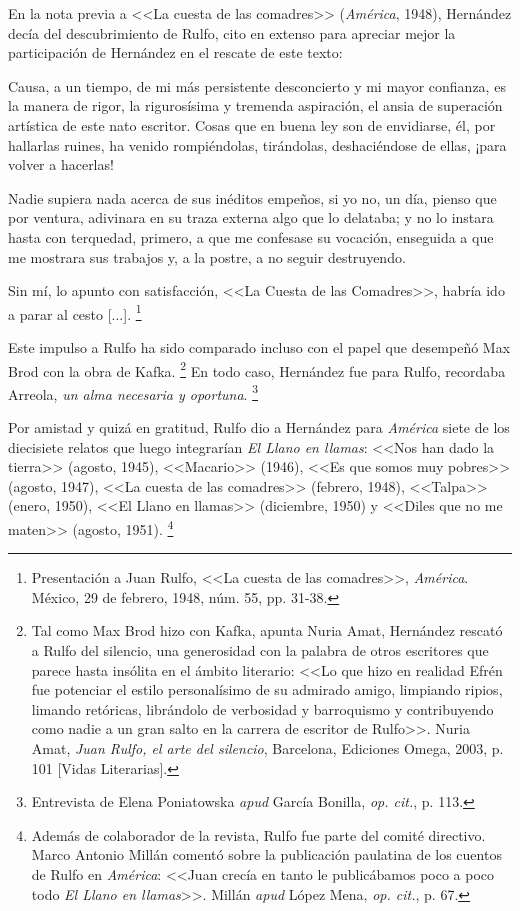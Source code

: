 \documentclass[14pt,twoside,final]{extbook} %
\let\oldfootnote\footnote
\renewcommand\footnote[1]{%
\oldfootnote{\hspace{1mm}#1}}
\begin{document}
En la nota previa a <<La cuesta de las comadres>> (\emph{América}, 1948), Hernández
decía del descubrimiento de Rulfo, cito en extenso para apreciar mejor la
participación de Hernández en el rescate de este texto:
\begin{quoting}
Causa, a un tiempo, de mi más persistente desconcierto y mi mayor confianza, es la manera de rigor, la rigurosísima y tremenda aspiración, el ansia de superación artística de este nato escritor. Cosas que en buena ley son de envidiarse, él, por hallarlas ruines, ha venido rompiéndolas, tirándolas, deshaciéndose de ellas, ¡para volver a hacerlas!

Nadie supiera nada acerca de sus inéditos empeños, si yo no, un día, pienso que por ventura, adivinara en su traza externa algo que lo delataba; y no lo instara hasta con terquedad, primero, a que me confesase su vocación, enseguida a que me mostrara sus trabajos y, a la postre, a no seguir destruyendo.

Sin mí, lo apunto con satisfacción, <<La Cuesta de las Comadres>>, habría ido a parar al cesto [...].\footnote{Presentación a Juan Rulfo, <<La cuesta de las comadres>>, \emph{América}. México, 29 de febrero, 1948, núm. 55, pp. 31-38.}
\end{quoting}
Este impulso a Rulfo ha sido comparado incluso con el papel que desempeñó Max Brod con la obra de Kafka.\footnote{Tal como Max Brod hizo con Kafka, apunta Nuria Amat, Hernández rescató a Rulfo del silencio, una generosidad con la palabra de otros escritores que parece hasta insólita en el ámbito literario: <<Lo que hizo en realidad Efrén fue potenciar el estilo personalísimo de su admirado amigo, limpiando ripios, limando retóricas, librándolo de verbosidad y barroquismo y contribuyendo como nadie a un gran salto en la carrera de escritor de Rulfo>>. Nuria Amat, \emph{Juan Rulfo, el arte del silencio}, Barcelona, Ediciones Omega, 2003, p. 101 [Vidas Literarias].} En todo caso, Hernández fue para Rulfo, recordaba Arreola, \emph{un alma necesaria y oportuna}.\footnote{Entrevista de Elena Poniatowska \emph{apud} García Bonilla, \emph{op. cit.}, p. 113.}

Por amistad y quizá en gratitud, Rulfo dio a Hernández para \emph{América} siete de los diecisiete relatos que luego integrarían \emph{El Llano en llamas}: <<Nos han dado la tierra>> (agosto, 1945), <<Macario>> (1946), <<Es que somos muy pobres>> (agosto, 1947), <<La cuesta de las comadres>> (febrero, 1948), <<Talpa>> (enero, 1950), <<El Llano en llamas>> (diciembre, 1950) y <<Diles que no me maten>> (agosto, 1951).\footnote{Además de colaborador de la revista, Rulfo fue parte del comité directivo. Marco Antonio Millán comentó sobre la publicación paulatina de los cuentos de Rulfo en \emph{América}: <<Juan crecía en tanto le publicábamos poco a poco todo \emph{El Llano en llamas}>>. Millán \emph{apud} López Mena, \emph{op. cit.}, p. 67.}
\end{document}

